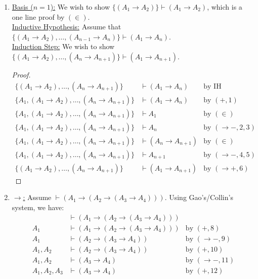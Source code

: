 \documentclass[12pt]{article}
\begin{document}
\begin{enumerate}
    \item \underline{Basis ($n=1$):} We wish to show $\{(A_1\to A_2)\}\vdash (A_1\to A_2)$, which is a one line proof by $(\in)$.\\
            \underline{Inductive Hypothesis:} Assume that $\{(A_1\to A_2),\dots,(A_{n-1}\to A_n)\}\vdash (A_1\to A_n)$.\\
            \underline{Induction Step:} We wish to show $\{(A_1\to A_2),\dots,(A_n\to A_{n+1})\}\vdash (A_1\to A_{n+1})$.
            \begin{proof}
                \begin{align}
                    \{(A_1\to A_2),\dots,(A_n\to A_{n+1})\} &\vdash (A_1\to A_n)&\text{by IH}\\
                    \{A_1,(A_1\to A_2),\dots,(A_n\to A_{n+1})\} &\vdash (A_1\to A_n)&\text{by }(+, 1)\\
                    \{A_1,(A_1\to A_2),\dots,(A_n\to A_{n+1})\} &\vdash A_1 &\text{by }(\in)\\
                    \{A_1,(A_1\to A_2),\dots,(A_n\to A_{n+1})\} &\vdash A_n&\text{by }(\to -, 2,3)\\
                    \{A_1,(A_1\to A_2),\dots,(A_n\to A_{n+1})\} &\vdash (A_n\to A_{n+1})&\text{by }(\in)\\
                    \{A_1,(A_1\to A_2),\dots,(A_n\to A_{n+1})\} &\vdash A_{n+1}&\text{by }(\to -, 4, 5)\\
                    \{(A_1\to A_2),\dots,(A_n\to A_{n+1})\} &\vdash (A_1\to A_{n+1})&\text{by }(\to +, 6)
                \end{align}
            \end{proof}
    \item 
        \underline{$\to$:} Assume $\vdash (A_1\to (A_2\to (A_3\to A_4)))$. Using Gao's/Collin's system, we have:
        \begin{align}
            &\vdash (A_1\to (A_2\to (A_3\to A_4)))\\
            A_1 &\vdash (A_1\to (A_2\to (A_3\to A_4)))&\text{by }(+, 8) \\
            A_1 &\vdash (A_2\to (A_3\to A_4))&\text{by }(\to -, 9) \\
            A_1,A_2 &\vdash (A_2\to (A_3\to A_4))&\text{by }(+, 10) \\
            A_1,A_2 &\vdash (A_3\to A_4)&\text{by }(\to -, 11) \\
            A_1,A_2, A_3 &\vdash (A_3\to A_4)&\text{by }(+, 12) \\

\end{align}
\end{enumerate}
\end{document}
